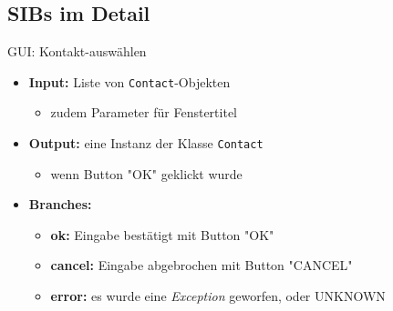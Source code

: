 \subsection*{SIBs im Detail}
\begin{frame}{GUI: Kontakt-auswählen}
\begin{itemize}[<+->]
	\item \textbf{Input:} Liste von \texttt{Contact}-Objekten 
		\begin{itemize}[<+->]
			\item zudem Parameter für Fenstertitel
		\end{itemize}
	\item \textbf{Output:} eine Instanz der Klasse \texttt{Contact}
		\begin{itemize}[<+->]
			\item wenn Button "OK" geklickt wurde
		\end{itemize}
	
	\item \textbf{Branches:} 
		\begin{itemize}[<+->]
			\item \textbf{ok:} Eingabe bestätigt mit Button "OK"
			\item \textbf{cancel:} Eingabe abgebrochen mit Button "CANCEL"
			\item \textbf{error:} es wurde eine \textit{Exception} geworfen, oder UNKNOWN
		\end{itemize}
	
\end{itemize}
\end{frame}


